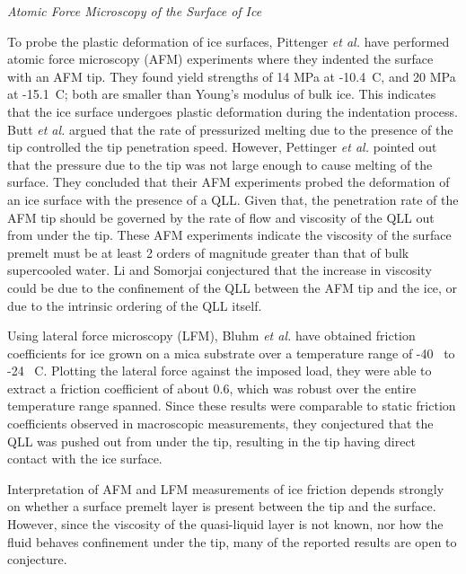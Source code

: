 \begin{flushleft}
\textit{Atomic Force Microscopy of the Surface of Ice}
\end{flushleft}

To probe the plastic deformation of ice surfaces, Pittenger \textit{et
  al.} have performed atomic force microscopy (AFM) experiments where
they indented the surface with an AFM tip.\cite{Butt2000,
  Pittenger2001,Bluhm2000} They found yield strengths of 14 MPa at
-10.4\degree~C, and 20 MPa at -15.1\degree~C; both are smaller than
Young's modulus of bulk ice. This indicates that the ice surface
undergoes plastic deformation during the indentation process. Butt
\textit{et al.}  argued that the rate of pressurized melting due to
the presence of the tip controlled the tip penetration
speed.\cite{Butt2000} However, Pettinger \textit{et al.} pointed out
that the pressure due to the tip was not large enough to cause melting
of the surface.\cite{Pittenger2001} They concluded that their AFM
experiments probed the deformation of an ice surface with the presence
of a QLL. Given that, the penetration rate of the AFM tip should be
governed by the rate of flow and viscosity of the QLL out from under
the tip. These AFM experiments indicate the viscosity of the surface
premelt must be at least 2 orders of magnitude greater than that of
bulk supercooled water. Li and Somorjai conjectured that the increase
in viscosity could be due to the confinement of the QLL between the
AFM tip and the ice, or due to the intrinsic ordering of the QLL
itself.\cite{Li2007}

Using lateral force microscopy (LFM), Bluhm \textit{et al.} have
obtained friction coefficients for ice grown on a mica substrate over
a temperature range of -40\degree~ to -24\degree~ C.\cite{Bluhm2000}
Plotting the lateral force against the imposed load, they were able to
extract a friction coefficient of about 0.6, which was robust over the
entire temperature range spanned. Since these results were comparable
to static friction coefficients observed in macroscopic measurements,
they conjectured that the QLL was pushed out from under the tip,
resulting in the tip having direct contact with the ice surface. 

Interpretation of AFM and LFM measurements of ice friction depends
strongly on whether a surface premelt layer is present between the tip
and the surface. However, since the viscosity of the quasi-liquid
layer is not known, nor how the fluid behaves confinement under the
tip, many of the reported results are open to conjecture.









